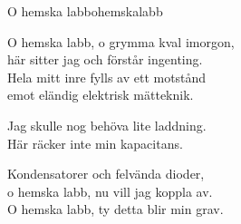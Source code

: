 \begin{song}{O hemska labb}{ohemskalabb}
\begin{vers}
O hemska labb, o grymma kval imorgon,\\
här sitter jag och förstår ingenting.\\
Hela mitt inre fylls av ett motstånd\\
emot eländig elektrisk mätteknik.\\
\end{vers}
\begin{vers}
Jag skulle nog behöva lite laddning.\\
Här räcker inte min kapacitans.\\
\end{vers}
\begin{vers}
Kondensatorer och felvända dioder,\\
o hemska labb, nu vill jag koppla av.\\
O hemska labb, ty detta blir min grav.\\
\end{vers}
\end{song}
